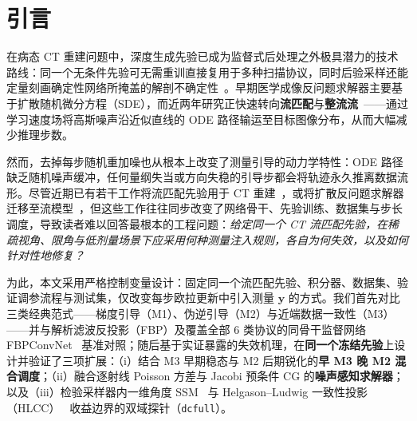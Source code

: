 \documentclass[11pt,UTF8]{ctexart}
\newcommand{\y}{\bm{y}}
\begin{document}
\section{引言}
在病态 CT 重建问题中，深度生成先验已成为监督式后处理之外极具潜力的技术路线：同一个无条件先验可无需重训直接复用于多种扫描协议，同时后验采样还能定量刻画确定性网络所掩盖的解剖不确定性~\cite{song2022scoremed,chung2022mcg,chung2023dps}。早期医学成像反问题求解器主要基于扩散随机微分方程（SDE），而近两年研究正快速转向\textbf{流匹配}与\textbf{整流流}~\cite{lipman2023flow,liu2023rectified}——通过学习速度场将高斯噪声沿近似直线的 ODE 路径输运至目标图像分布，从而大幅减少推理步数。

然而，去掉每步随机重加噪也从根本上改变了测量引导的动力学特性：ODE 路径缺乏随机噪声缓冲，任何量纲失当或方向失稳的引导步都会将轨迹永久推离数据流形。尽管近期已有若干工作将流匹配先验用于 CT 重建~\cite{evangelista2026pgfm,eFMCT2026,lucid2026}，或将扩散反问题求解器迁移至流模型~\cite{pokle2024otode,martin2025pnpflow,kim2025flowdps}，但这些工作往往同步改变了网络骨干、先验训练、数据集与步长调度，导致读者难以回答最根本的工程问题：\emph{给定同一个 CT 流匹配先验，在稀疏视角、限角与低剂量场景下应采用何种测量注入规则，各自为何失效，以及如何针对性地修复？}

为此，本文采用严格控制变量设计：固定同一个流匹配先验、积分器、数据集、验证调参流程与测试集，仅改变每步欧拉更新中引入测量 $\y$ 的方式。我们首先对比三类经典范式——梯度引导（M1）、伪逆引导（M2）与近端数据一致性（M3）——并与解析滤波反投影（FBP）及覆盖全部 6 类协议的同骨干监督网络 FBPConvNet~\cite{jin2017fbpconvnet} 基准对照；随后基于实证暴露的失效机理，在\textbf{同一个冻结先验}上设计并验证了三项扩展：（i）结合 M3 早期稳态与 M2 后期锐化的\textbf{早 M3 晚 M2 混合调度}；（ii）融合逐射线 Poisson 方差与 Jacobi 预条件 CG 的\textbf{噪声感知求解器}；以及（iii）检验采样器内一维角度 SSM~\cite{gu2024mamba} 与 Helgason--Ludwig 一致性投影（HLCC）~\cite{helgason1999radon} 收益边界的双域探针（\texttt{dcfull}）。
\end{document}
